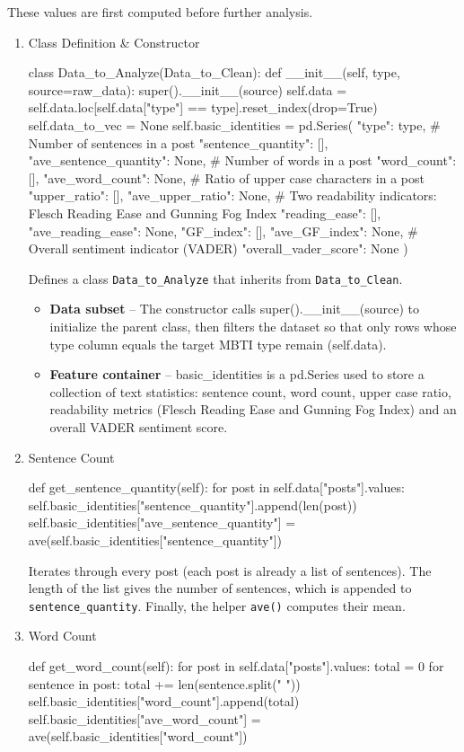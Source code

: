\documentclass[12pt]{article}
\numberwithin{figure}{section}  %
\begin{document}
	These values are first computed before further analysis.
	\begin{enumerate}
		\item Class Definition \& Constructor
		\begin{python}
class Data_to_Analyze(Data_to_Clean):
    def __init__(self, type, source=raw_data):
        super().__init__(source)
        self.data = self.data.loc[self.data["type"] == type].reset_index(drop=True)
        self.data_to_vec = None
        self.basic_identities = pd.Series({
            "type": type,
            # Number of sentences in a post
            "sentence_quantity": [],
            "ave_sentence_quantity": None,
            # Number of words in a post
            "word_count": [],
            "ave_word_count": None,
            # Ratio of upper case characters in a post
            "upper_ratio": [],
            "ave_upper_ratio": None,
            # Two readability indicators: Flesch Reading Ease and Gunning Fog Index
            "reading_ease": [],
            "ave_reading_ease": None,
            "GF_index": [],
            "ave_GF_index": None,
            # Overall sentiment indicator (VADER)
            "overall_vader_score": None
        })

		\end{python}
		Defines a class \texttt{Data\_to\_Analyze} that inherits from \texttt{Data\_to\_Clean}.
		\begin{itemize}
			\item \textbf{Data subset} – The constructor calls
			super().\_\_init\_\_(source) to initialize the parent class, then
			filters the dataset so that only rows whose type column equals the
			target MBTI type remain (self.data).
			\item \textbf{Feature container} – basic\_identities is a pd.Series
			used to store a collection of text statistics: sentence count, word
			count, upper case ratio, readability metrics (Flesch Reading Ease
			and Gunning Fog Index) and an overall VADER sentiment score.
		\end{itemize}
		\item Sentence Count
		\begin{python}
def get_sentence_quantity(self):
    for post in self.data["posts"].values:
        self.basic_identities["sentence_quantity"].append(len(post))
    self.basic_identities["ave_sentence_quantity"] = ave(self.basic_identities["sentence_quantity"])
		\end{python}
		
		Iterates through every post (each post is already a list of sentences).
		The length of the list gives the number of sentences, which is appended
		to \texttt{sentence\_quantity}. Finally, the helper \texttt{ave()} computes their mean.
		\item Word Count
		\begin{python}
def get_word_count(self):
    for post in self.data["posts"].values:
        total = 0
        for sentence in post:
            total += len(sentence.split(" "))
        self.basic_identities["word_count"].append(total)
    self.basic_identities["ave_word_count"] = ave(self.basic_identities["word_count"])
		\end{python}
		

\end{enumerate}
\end{document}
